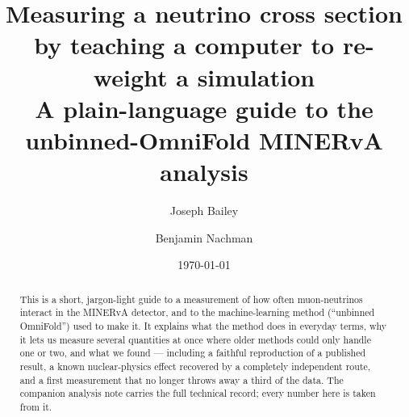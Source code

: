 \documentclass[11pt]{article}
\title{Measuring a neutrino cross section by teaching a computer to
re-weight a simulation\\[4pt]
\large A plain-language guide to the unbinned-OmniFold MINERvA analysis}
\author{Joseph Bailey \and Benjamin Nachman}
\date{\today}
\begin{document}
\maketitle

\begin{abstract}
This is a short, jargon-light guide to a measurement of how often
muon-neutrinos interact in the MINERvA detector, and to the machine-learning
method (``unbinned OmniFold'') used to make it. It explains what the method
does in everyday terms, why it lets us measure several quantities at once where
older methods could only handle one or two, and what we found --- including a
faithful reproduction of a published result, a known nuclear-physics effect
recovered by a completely independent route, and a first measurement that no
longer throws away a third of the data. The companion analysis note carries the
full technical record; every number here is taken from it.
\end{abstract}



\printbibliography
\end{document}
